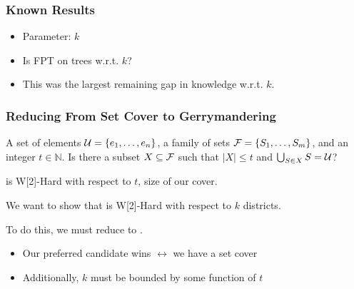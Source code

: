 \begin{frame}[t]
    \frametitle{Known Results}
    \begin{itemize}
		\item Parameter: $k$
	\end{itemize}
	
    
	

	 {
		\begin{itemize}
			\item Is \gm FPT on trees w.r.t. $k$?
			\item This was the largest remaining gap in knowledge w.r.t. $k$.
		\end{itemize}
	}
\end{frame}

\begin{frame}[t]
    \frametitle{Reducing From Set Cover to Gerrymandering}
    {A set of elements $\mathcal{U} = \{e_1, \dots, e_n\}$, a family of sets $\mathcal{F} = \{S_1, \dots, S_m\}$, and an integer $t \in \mathbb{N}$.}
    {Is there a subset $X \subseteq \mathcal{F}$ such that $|X| \leq t$ and $\bigcup_{S \in X} S = \mathcal{U}$?}
    
    \scov is W[2]-Hard with respect to $t$, size of our cover.

    We want to show that \gm is W[2]-Hard with respect to $k$ districts.

    \vspace{1.0cm}
    To do this, we must reduce \scov to \gm.
    \begin{itemize}
        \item Our preferred candidate wins $\leftrightarrow$ we have a set cover
        \item Additionally, $k$ must be bounded by some function of $t$
    \end{itemize}
\end{frame}

